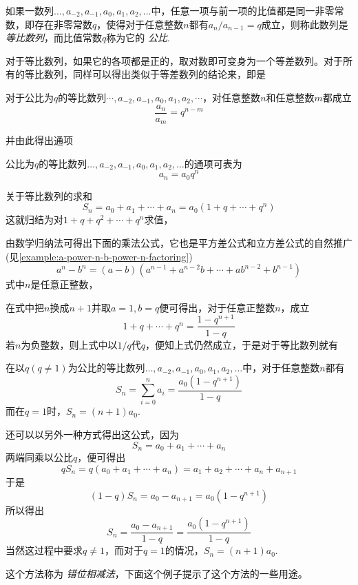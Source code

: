 \begin{definition}
  如果一数列$\ldots,a_{-2},a_{-1},a_0,a_1,a_2,\ldots$中，任意一项与前一项的比值都是同一非零常数，即存在非零常数$q$，使得对于任意整数$n$都有$a_n / a_{n-1} = q$成立，则称此数列是 \emph{等比数列}，而比值常数$q$称为它的 \emph{公比}.
\end{definition}

对于等比数列，如果它的各项都是正的，取对数即可变身为一个等差数列。对于所有的等比数列，同样可以得出类似于等差数列的结论来，即是

\begin{theorem}
对于公比为$q$的等比数列$\cdots,a_{-2},a_{-1},a_0,a_1,a_2,\cdots$，对任意整数$n$和任意整数$m$都成立
\[ \frac{a_n}{a_m}=q^{n-m} \]
\end{theorem}

并由此得出通项
\begin{theorem}
  公比为$q$的等比数列$\ldots,a_{-2},a_{-1},a_0,a_1,a_2,\ldots$的通项可表为
 \[ a_n=a_0q^n \]
\end{theorem}

关于等比数列的求和
\[ S_n = a_0+a_1+\cdots+a_n = a_0(1+q+\cdots+q^{n}) \]
这就归结为对$1+q+q^2+\cdots+q^{n}$求值，

由数学归纳法可得出下面的乘法公式，它也是平方差公式和立方差公式的自然推广(见\autoref{example:a-power-n-b-power-n-factoring})
\begin{equation}
  \label{eq:a-power-n-substract-b-power-n}
 a^n-b^n = (a-b)(a^{n-1}+a^{n-2}b+\cdots+ab^{n-2}+b^{n-1}) 
\end{equation}
式中$n$是任意正整数，

在式中把$n$换成$n+1$并取$a=1,b=q$便可得出，对于任意正整数$n$，成立
\[ 1+q+\cdots+q^{n} = \frac{1-q^{n+1}}{1-q} \]
若$n$为负整数，则上式中以$1/q$代$q$，便知上式仍然成立，于是对于等比数列就有
\begin{theorem}
  在以$q(q \neq 1)$为公比的等比数列$\ldots,a_{-2},a_{-1},a_0,a_1,a_2,\ldots$中，对于任意整数$n$都有
  \[ S_n = \sum_{i=0}^na_i = \frac{a_0(1-q^{n+1})}{1-q} \]
  而在$q=1$时，$S_n=(n+1)a_0$.
\end{theorem}

还可以以另外一种方式得出这公式，因为
\[ S_n = a_0+a_1+\cdots+a_n \]
两端同乘以公比$q$，便可得出
\[ qS_n = q(a_0+a_1+\cdots+a_n) = a_1+a_2+\cdots+a_n+a_{n+1} \]
于是
\[ (1-q)S_n = a_0-a_{n+1} = a_0(1-q^{n+1}) \]
所以得出
\[ S_n = \frac{a_0-a_{n+1}}{1-q} = \frac{a_0(1-q^{n+1})}{1-q} \]
当然这过程中要求$q \neq 1$，而对于$q=1$的情况，$S_n=(n+1)a_0$.

这个方法称为 \emph{错位相减法}，下面这个例子提示了这个方法的一些用途。

